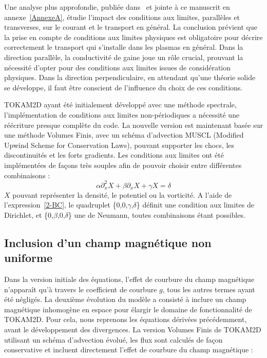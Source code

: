 \begin{refsection}
	Une analyse plus approfondie, publiée dans~\parencite{Futtersack} et
	jointe à ce manuscrit en annexe~\ref{AnnexeA}, étudie l'impact des conditions
	aux limites, parallèles et transverses, sur le courant et le transport en général.
	La conclusion prévient que la prise en compte de conditions aux limites
	physiques est obligatoire pour décrire correctement le transport qui s'installe
	dans les plasmas en général. Dans la direction parallèle, la conductivité de
	gaine joue un rôle crucial, prouvant la nécessité d'opter pour des conditions
	aux limites issues de considération physiques. Dans la direction
	perpendiculaire, en attendant qu'une théorie solide se développe, il faut être
	conscient de l'influence du choix de ces conditions.
	
	TOKAM2D ayant été initialement
	développé avec une méthode spectrale, l'implémentation de conditions aux
	limites non-périodiques a nécessité une réécriture presque complète du code.
	La nouvelle version est maintenant basée sur une méthode Volumes Finis, avec un
	schéma d'advection MUSCL (Modified Upwind Scheme for Conservation Laws),
	pouvant supporter les chocs, les discontinuités et les forts gradients. Les
	conditions aux limites ont été implémentées de façons très souples afin de
	pouvoir choisir entre différentes combinaisons :
	\begin{equation}
	\label{2-BC}
		\alpha \partial^2_{x}X + \beta \partial_{x}X + \gamma X =
		\delta
	\end{equation}
	$X$ pouvant représenter la densité, le potentiel ou la vorticité. A l'aide de
	l'expression~\ref{2-BC}, le quadruplet \{0,0,$\gamma$,$\delta$\} définit une
	condition aux limites de Dirichlet, et \{0,$\beta$,0,$\delta$\} une de
	Neumann, toutes combinaisons étant possibles.
	
	\subsection{Inclusion d'un champ magnétique non uniforme}
	
	Dans la version initiale
	des équations, l'effet de courbure du champ magnétique n'apparaît qu'à travers
	le coefficient de courbure $g$, tous les autres termes ayant été négligés.
	La deuxième évolution du modèle a consisté à inclure un champ magnétique
	inhomogène en espace pour élargir le domaine de fonctionnalité de TOKAM2D. Pour
	cela, nous reprenons les équations dérivées précédemment, avant le développement
	des divergences. La version Volumes Finis de TOKAM2D utilisant un schéma
	d'advection évolué, les flux sont calculés de façon conservative et incluent
	directement l'effet de courbure du champ magnétique :
	

\end{refsection}
